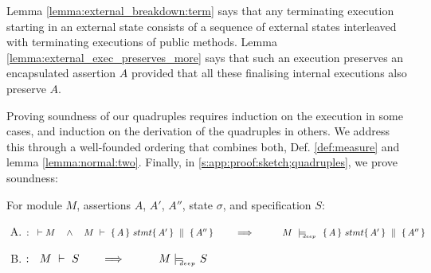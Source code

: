 Lemma \ref{lemma:external_breakdown:term} %
says that any terminating execution 
 starting in an external state  consists of a  sequence of  external states interleaved with terminating executions
  of public methods.
Lemma  \ref{lemma:external_exec_preserves_more} says that such an execution preserves an encapsulated assertion $A$  
provided that all these finalising internal executions  %
also preserve $A$.
% 
  



Proving soundness of our quadruples  requires  induction on the execution  in  some cases, and  induction on the derivation of the quadruples in others.  We address this   through  a well-founded ordering that combines both, \cf 
\label{sect:prove:wellfounded}
\label{sect:prove:sound:quadruples}
  Def.  \ref{def:measure}  and  lemma \ref{lemma:normal:two}. 
  Finally, in \ref{s:app:proof:sketch;quadruples}, we prove soundness:
 

\begin{theorem}
\label{t:quadruple:sound}
\label{thm:soundness}
For module  $M$,   assertions $A$, $A'$, $A''$,   state  $\sigma$, and specification $S$:

\begin{enumerate}[(A)]
\item
 $:\strut \   \vdash M  \ \ \ \wedge \ \ \  M\ \vdash\  \quadruple {A} {stmt} {A'} {A''}  \ \ \ \ \ \ \ \Longrightarrow \ \ \ \ \ \  \ \ \  M\ \modelsD\  \quadruple {A} {stmt} {A'} {A''}$
 \item
  $:\strut \  \  \proves{M}{S}\ \ \ \ \ \ \Longrightarrow\ \ \ \ \ \  \ \ \ {M} \modelsD {S}$
 
\end{enumerate}

\end{theorem}

